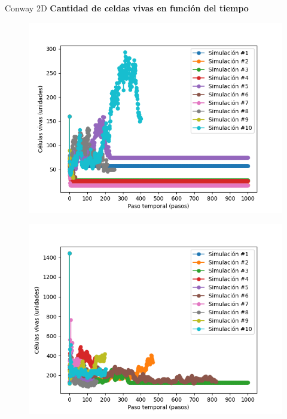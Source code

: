 \begin{frame}{Conway 2D}
    \textbf{Cantidad de celdas vivas en función del tiempo}
    \begin{multicols}{2}
        {
            \begin{figure}[H]
                \centering
                \includegraphics[width=0.8\linewidth]{pic/conway2d/size_i10}
                \label{fig:conway2d:size:i10}
            \end{figure}
        }


        {
            \begin{figure}[H]
                \centering
                \includegraphics[width=0.8\linewidth]{pic/conway2d/size_i90}
                \label{fig:conway2d:size:i90}
            \end{figure}
        }
    \end{multicols}
\end{frame}

